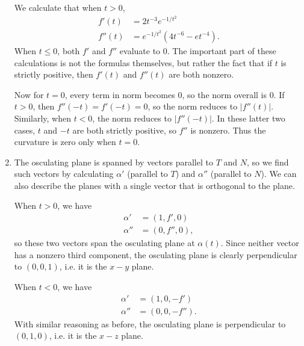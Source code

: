 \documentclass[10pt]{report}
\begin{document}
\begin{enumerate}
		We calculate that when $t>0$,
		\begin{align*}
			f'(t) &= 2t^{-3}e^{-1/t^2} \\
			f''(t) &= e^{-1/t^2}(4t^{-6}-et^{-4}).
		\end{align*}
		When $t\leq 0$, both $f'$ and $f''$ evaluate to 0. The important part of these calculations is not the formulas themselves, but rather the fact that if $t$ is strictly positive, then $f'(t)$ and $f''(t)$ are both nonzero.

		Now for $t=0$, every term in norm becomes 0, so the norm overall is 0. If $t > 0$, then $f''(-t)=f'(-t)=0$, so the norm reduces to $|f''(t)|$. Similarly, when $t<0$, the norm reduces to $|f''(-t)|$. In these latter two cases, $t$ and $-t$ are both strictly positive, so $f''$ is nonzero. Thus the curvature is zero only when $t=0$.

	\item The osculating plane is spanned by vectors parallel to $T$ and $N$, so we find such vectors by calculating $\alpha'$ (parallel to $T$) and $\alpha''$ (parallel to $N$). We can also describe the planes with a single vector that is orthogonal to the plane.

		When $t>0$, we have
		\begin{align*}
			\alpha' &= (1, f', 0) \\
			\alpha'' &= (0, f'', 0),
		\end{align*}
		so these two vectors span the osculating plane at $\alpha(t)$. Since neither vector has a nonzero third component, the osculating plane is clearly perpendicular to $(0, 0, 1)$, i.e. it is the $x-y$ plane.

		When $t<0$, we have
		\begin{align*}
			\alpha' &= (1, 0, -f') \\
			\alpha'' &= (0, 0, -f'').
		\end{align*}
		With similar reasoning as before, the osculating plane is perpendicular to $(0, 1, 0)$, i.e. it is the $x-z$ plane.
\end{enumerate}
\end{document}
